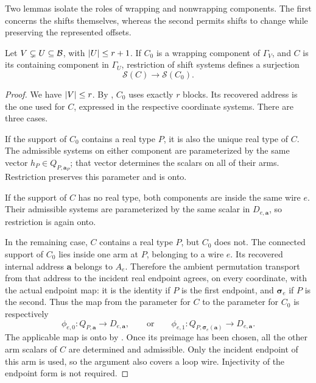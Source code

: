 Two lemmas isolate the roles of wrapping and nonwrapping components.
The first concerns the shifts themselves, whereas the second permits
shifts to change while preserving the represented offsets.

\begin{lemma}
\label{offset:lem-wrapping-lift}
Let \(V\subsetneq U\subseteq\mathcal B\), with \(\lvert U\rvert\le r+1\).
If \(C_0\) is a wrapping component of \(\Gamma_V\), and \(C\) is its
containing component in \(\Gamma_U\), restriction of shift systems defines
a surjection
\[
    \mathcal S(C)\longrightarrow\mathcal S(C_0).
\]
\end{lemma}

\begin{proof}
We have \(\lvert V\rvert\le r\). By , \(C_0\) uses
exactly \(r\) blocks. Its recovered address is the one used for \(C\),
expressed in the respective coordinate systems. There are three cases.

If the support of \(C_0\) contains a real type \(P\), it is also the
unique real type of \(C\). The admissible systems on either component
are parameterized by the same vector \(h_P\in Q_{P,\mathbf a_P}\);
that vector determines the scalars on all of their arms. Restriction
preserves this parameter and is onto.

If the support of \(C\) has no real type, both components are inside the
same wire \(e\). Their admissible systems are parameterized by the same
scalar in \(D_{e,\mathbf a}\), so restriction is again onto.

In the remaining case, \(C\) contains a real type \(P\), but \(C_0\) does
not. The connected support of \(C_0\) lies inside one arm at \(P\),
belonging to a wire \(e\). Its recovered internal address
\(\mathbf a\) belongs to \(A_e\). Therefore the ambient permutation
transport from that address to the incident real endpoint agrees, on
every coordinate, with the actual endpoint map: it is the identity if
\(P\) is the first endpoint, and \(\boldsymbol\sigma_e\) if \(P\) is the
second. Thus the map from the parameter for \(C\) to the parameter for
\(C_0\) is respectively
\[
 \phi_{e,0}:Q_{P,\mathbf a}\longrightarrow D_{e,\mathbf a},
 \qquad\text{or}\qquad
 \phi_{e,1}:Q_{P,\boldsymbol\sigma_e(\mathbf a)}
                    \longrightarrow D_{e,\mathbf a}.
\]
The applicable map is onto by .
Once its preimage has been chosen, all the other arm scalars of \(C\)
are determined and admissible. Only the incident endpoint of this arm
is used, so the argument also covers a loop wire. Injectivity of the
endpoint form is not required.
\end{proof}


